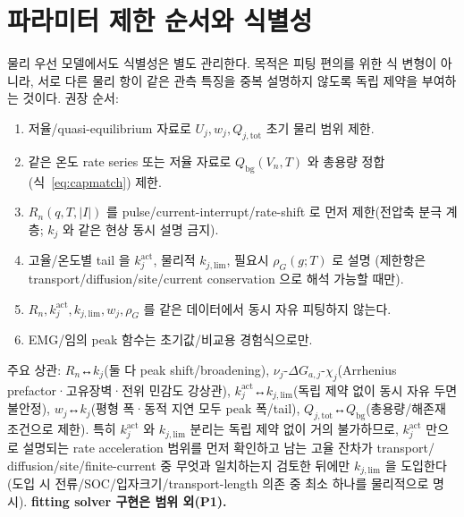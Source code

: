 \documentclass[11pt,a4paper]{article}
\newcommand{\tot}{\mathrm{tot}}
\newcommand{\bg}{\mathrm{bg}}
\begin{document}
\section{파라미터 제한 순서와 식별성}\label{sec:ident}
물리 우선 모델에서도 식별성은 별도 관리한다. 목적은 피팅 편의를 위한 식 변형이 아니라, 서로 다른 물리
항이 같은 관측 특징을 중복 설명하지 않도록 독립 제약을 부여하는 것이다. 권장 순서:
\begin{enumerate}[label=\arabic*),leftmargin=2.0em]
\item 저율/quasi-equilibrium 자료로 $U_j,w_j,Q_{j,\tot}$ 초기 물리 범위 제한.
\item 같은 온도 rate series 또는 저율 자료로 $Q_\bg(V_n,T)$ 와 총용량 정합(식~\eqref{eq:capmatch}) 제한.
\item $R_n(q,T,|I|)$ 를 pulse/current-interrupt/rate-shift 로 먼저 제한(전압축 분극 계층; $k_j$ 와 같은
  현상 동시 설명 금지).
\item 고율/온도별 tail 을 $k_j^\mathrm{act}$, 물리적 $k_{j,\mathrm{lim}}$, 필요시 $\rho_G(g;T)$ 로 설명
  (제한항은 transport/diffusion/site/current conservation 으로 해석 가능할 때만).
\item $R_n,k_j^\mathrm{act},k_{j,\mathrm{lim}},w_j,\rho_G$ 를 같은 데이터에서 동시 자유 피팅하지 않는다.
\item EMG/임의 peak 함수는 초기값/비교용 경험식으로만.
\end{enumerate}
주요 상관: $R_n$↔$k_j$(둘 다 peak shift/broadening), $\nu_j$-$\Delta G_{a,j}$-$\chi_j$(Arrhenius
prefactor·고유장벽·전위 민감도 강상관), $k_j^\mathrm{act}$↔$k_{j,\mathrm{lim}}$(독립 제약 없이 동시
자유 두면 불안정), $w_j$↔$k_j$(평형 폭·동적 지연 모두 peak 폭/tail), $Q_{j,\tot}$↔$Q_\bg$(총용량/해존재
조건으로 제한). 특히 $k_j^\mathrm{act}$ 와 $k_{j,\mathrm{lim}}$ 분리는 독립 제약 없이 거의 불가하므로,
$k_j^\mathrm{act}$ 만으로 설명되는 rate acceleration 범위를 먼저 확인하고 남는 고율 잔차가 transport/
diffusion/site/finite-current 중 무엇과 일치하는지 검토한 뒤에만 $k_{j,\mathrm{lim}}$ 을 도입한다(도입 시
전류/SOC/입자크기/transport-length 의존 중 최소 하나를 물리적으로 명시). \textbf{fitting solver 구현은
범위 외(P1).}

\end{document}

